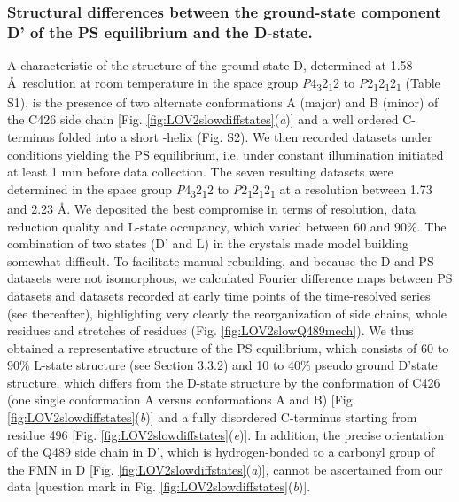 \subsubsection{Structural differences between the ground-state component D' of the PS equilibrium and the D-state.}
A characteristic of the structure of the ground state D, determined at 1.58 \AA\ resolution at room temperature in the space group \textit{P}4\textsubscript{3}2\textsubscript{1}2 to \textit{P}2\textsubscript{1}2\textsubscript{1}2\textsubscript{1} (Table S1), is the presence of two alternate conformations A (major) and B (minor) of the C426 side chain [Fig. \ref{fig:LOV2slowdiffstates}(\textit{a})] and a well ordered C-terminus folded into a short \textalpha-helix (Fig. S2). We then recorded datasets under conditions yielding the PS equilibrium, i.e. under constant illumination initiated at least 1 min before data collection. The seven resulting datasets were determined in the space group \textit{P}4\textsubscript{3}2\textsubscript{1}2 to \textit{P}2\textsubscript{1}2\textsubscript{1}2\textsubscript{1} at a resolution between 1.73 and 2.23 \AA. We deposited the best compromise in terms of resolution, data reduction quality and L-state occupancy, which varied between 60 and 90\%. The combination of two states (D' and L) in the crystals made model building somewhat difficult. To facilitate manual rebuilding, and because the D and PS datasets were not isomorphous, we calculated Fourier difference maps between PS datasets and datasets recorded at early time points of the time-resolved series (see thereafter), highlighting very clearly the reorganization of side chains, whole residues and stretches of residues (Fig. \ref{fig:LOV2slowQ489mech}). We thus obtained a representative structure of the PS equilibrium, which consists of 60 to 90\% L-state structure (see Section 3.3.2) and 10 to 40\% pseudo ground D'state structure, which differs from the D-state structure by the conformation of C426 (one single conformation A versus conformations A and B) [Fig. \ref{fig:LOV2slowdiffstates}(\textit{b})] and a fully disordered C-terminus starting from residue 496 [Fig. \ref{fig:LOV2slowdiffstates}(\textit{e})]. In addition, the precise orientation of the Q489 side chain in D', which is hydrogen-bonded to a carbonyl group of the FMN in D [Fig. \ref{fig:LOV2slowdiffstates}(\textit{a})], cannot be ascertained from our data [question mark in Fig. \ref{fig:LOV2slowdiffstates}(\textit{b})].

